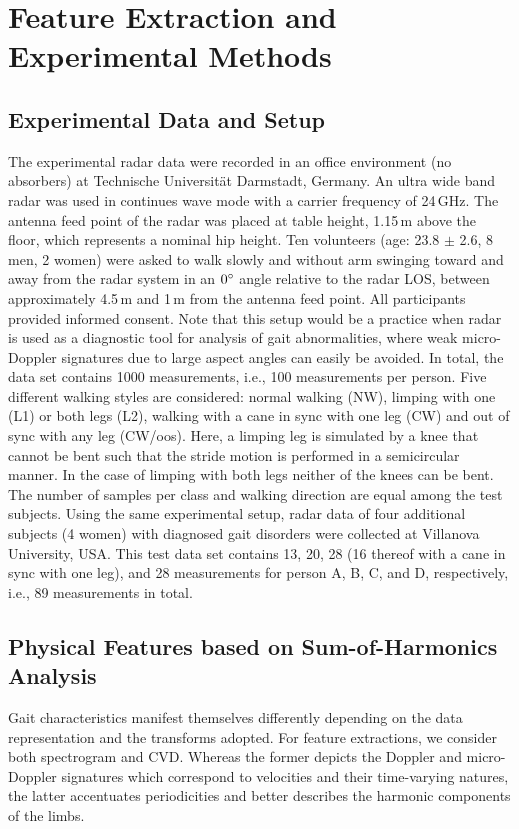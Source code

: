 \section{Feature Extraction and Experimental Methods}\label{sec:featextraction}

\subsection{Experimental Data and Setup}\label{sec:exp_setup}
The experimental radar data were recorded in an office environment (no absorbers) at Technische Universit\"{a}t Darmstadt, Germany. An ultra wide band radar \cite{Anc} was used in continues wave mode with a carrier frequency of 24\,GHz. The antenna feed point of the radar was placed at table height, 1.15\,m above the floor, which represents a nominal hip height. Ten volunteers (age: 23.8 $\pm$ 2.6, 8 men, 2 women) were asked to walk slowly and without arm swinging toward and away from the radar system in an $0\degree$ angle relative to the radar LOS, between approximately 4.5\,m and 1\,m from the antenna feed point. All participants provided informed consent. Note that this setup would be a practice when radar is used as a diagnostic tool for analysis of gait abnormalities, where weak micro-Doppler signatures due to large aspect angles can easily be avoided. In total, the data set contains 1000 measurements, i.e., 100 measurements per person. Five different walking styles are considered: normal walking (NW), limping with one (L1) or both legs (L2), walking with a cane in sync with one leg (CW) and out of sync with any leg (CW/oos). Here, a limping leg is simulated by a knee that cannot be bent such that the stride motion is performed in a semicircular manner. In the case of limping with both legs neither of the knees can be bent. The number of samples per class and walking direction are equal among the test subjects. Using the same experimental setup, radar data of four additional subjects (4 women) with diagnosed gait disorders were collected at Villanova University, USA. This test data set contains 13, 20, 28 (16 thereof with a cane in sync with one leg), and 28 measurements for person A, B, C, and D, respectively, i.e., 89 measurements in total.

\subsection{Physical Features based on Sum-of-Harmonics Analysis}\label{subsec:phyfeatures}
Gait characteristics manifest themselves differently depending on the data representation and the transforms adopted. For feature extractions, we consider both spectrogram and CVD. Whereas the former depicts the Doppler and micro-Doppler signatures which correspond to velocities and their time-varying natures, the latter accentuates periodicities and better describes the harmonic components of the limbs. 

